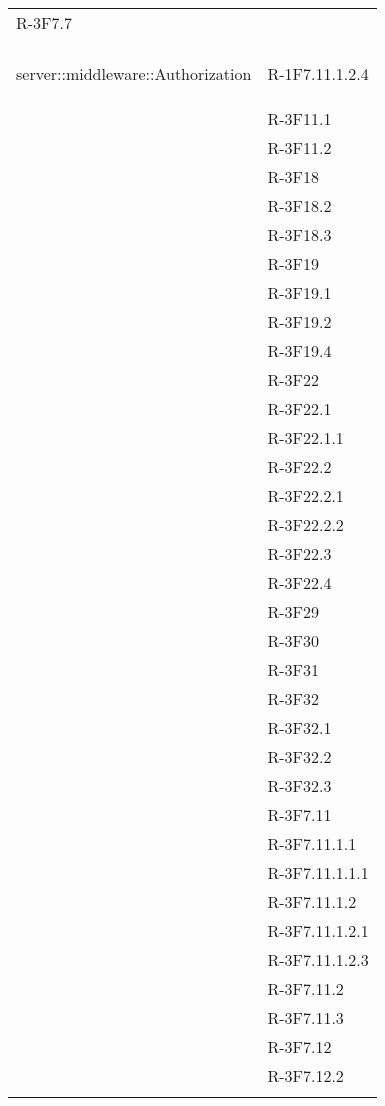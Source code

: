 \begin{longtable}{l p{3cm}}
	R-3F7.7 \tabularnewline &\tabularnewline
	\hline
	\hypertarget{server::middleware::Authorization}{server::middleware::Authorization} & R-1F7.11.1.2.4 \tabularnewline &
	
	R-3F11.1 \tabularnewline &
	
	R-3F11.2 \tabularnewline &
	
	R-3F18 \tabularnewline &
	
	R-3F18.2 \tabularnewline &
	
	R-3F18.3 \tabularnewline &
	
	R-3F19 \tabularnewline &
	
	R-3F19.1 \tabularnewline &
	
	R-3F19.2 \tabularnewline &
	
	R-3F19.4 \tabularnewline &
	
	R-3F22 \tabularnewline &
	
	R-3F22.1 \tabularnewline &
	
	R-3F22.1.1 \tabularnewline &
	
	R-3F22.2 \tabularnewline &
	
	R-3F22.2.1 \tabularnewline &
	
	R-3F22.2.2 \tabularnewline &
	
	R-3F22.3 \tabularnewline &
	
	R-3F22.4 \tabularnewline &
	
	R-3F29 \tabularnewline &
	
	R-3F30 \tabularnewline &
	
	R-3F31 \tabularnewline &
	
	R-3F32 \tabularnewline &
	
	R-3F32.1 \tabularnewline &
	
	R-3F32.2 \tabularnewline &
	
	R-3F32.3 \tabularnewline &
	
	R-3F7.11 \tabularnewline &
	
	R-3F7.11.1.1 \tabularnewline &
	
	R-3F7.11.1.1.1 \tabularnewline &
	
	R-3F7.11.1.2 \tabularnewline &
	
	R-3F7.11.1.2.1 \tabularnewline &
	
	R-3F7.11.1.2.3 \tabularnewline &
	
	R-3F7.11.2 \tabularnewline &
	
	R-3F7.11.3 \tabularnewline &
	
	R-3F7.12 \tabularnewline &
	
	R-3F7.12.2 \tabularnewline &
	

\end{longtable}
